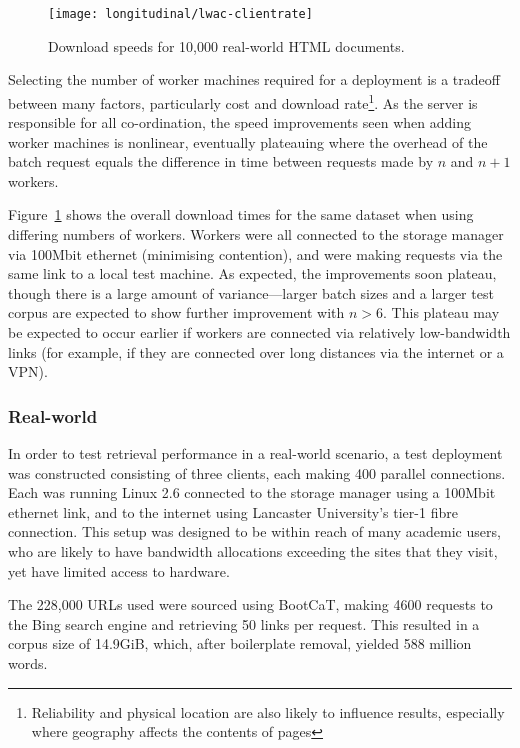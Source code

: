 \begin{figure}[ht]
    \centering
    \texttt{[image: longitudinal/lwac-clientrate]}
    \caption{Download speeds for 10,000 real-world HTML documents.}
    \label{fig:longitudinal:lwac:numclients}
\end{figure}


Selecting the number of worker machines required for a deployment is a tradeoff between many factors, particularly cost and download rate\footnote{Reliability and physical location are also likely to influence results, especially where geography affects the contents of pages}.  As the server is responsible for all co-ordination, the speed improvements seen when adding worker machines is nonlinear, eventually plateauing where the overhead of the batch request equals the difference in time between requests made by $n$ and $n + 1$ workers.

Figure~\ref{fig:longitudinal:lwac:numclients} shows the overall download times for the same dataset when using differing numbers of workers.  Workers were all connected to the storage manager via 100Mbit ethernet (minimising contention), and were making requests via the same link to a local test machine.  As expected, the improvements soon plateau, though there is a large amount of variance---larger batch sizes and a larger test corpus are expected to show further improvement with $n > 6$.  This plateau may be expected to occur earlier if workers are connected via relatively low-bandwidth links (for example, if they are connected over long distances via the internet or a VPN).





\subsubsection{Real-world}

In order to test retrieval performance in a real-world scenario, a test deployment was constructed consisting of three clients, each making 400 parallel connections.  Each was running Linux 2.6 connected to the storage manager using a 100Mbit ethernet link, and to the internet using Lancaster University's tier-1 fibre connection.  This setup was designed to be within reach of many academic users, who are likely to have bandwidth allocations exceeding the sites that they visit, yet have limited access to hardware.


The 228,000 URLs used were sourced using BootCaT, making 4600 requests to the Bing search engine and retrieving 50 links per request.  This resulted in a corpus size of 14.9GiB, which, after boilerplate removal, yielded 588 million words.


